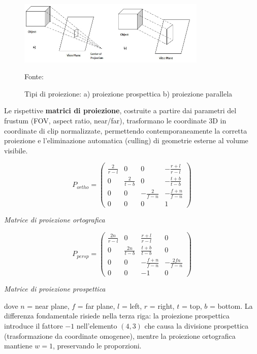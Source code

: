 \begin{figure}[htbp]
    \centering
    \includegraphics[width=0.8\textwidth]{images/perspective_vs_parallel.jpg}
    \caption{Tipi di proiezione: a) proiezione prospettica b) proiezione parallela}
    Fonte: \cite{projection_types}
\end{figure}
\newpage
 Le rispettive \textbf{matrici di proiezione}, costruite a partire dai parametri del frustum (FOV, aspect ratio, near/far), trasformano le coordinate 3D in coordinate di clip normalizzate, permettendo contemporaneamente la corretta proiezione e l'eliminazione automatica (culling) di geometrie esterne al volume visibile.

\begin{equation}
	P_{ortho} = \begin{pmatrix}
		\frac{2}{r-l} & 0 & 0 & -\frac{r+l}{r-l} \\
		0 & \frac{2}{t-b} & 0 & -\frac{t+b}{t-b} \\
		0 & 0 & -\frac{2}{f-n} & -\frac{f+n}{f-n} \\
		0 & 0 & 0 & 1
	\end{pmatrix}
\end{equation}
\begin{center}
	\textit{Matrice di proiezione ortografica}
\end{center}

\begin{equation}
P_{persp} = \begin{pmatrix}
\frac{2n}{r-l} & 0 & \frac{r+l}{r-l} & 0 \\
0 & \frac{2n}{t-b} & \frac{t+b}{t-b} & 0 \\
0 & 0 & -\frac{f+n}{f-n} & -\frac{2fn}{f-n} \\
0 & 0 & -1 & 0
\end{pmatrix}
\end{equation}
\begin{center}
	\textit{Matrice di proiezione prospettica}
\end{center}

dove $n$ = near plane, $f$ = far plane, $l$ = left, $r$ = right, $t$ = top, $b$ = bottom.
\newline
\noindent La differenza fondamentale risiede nella terza riga: la proiezione prospettica introduce il fattore $-1$ nell'elemento $(4,3)$ che causa la divisione prospettica (trasformazione da coordinate omogenee), mentre la proiezione ortografica mantiene $w = 1$, preservando le proporzioni.

